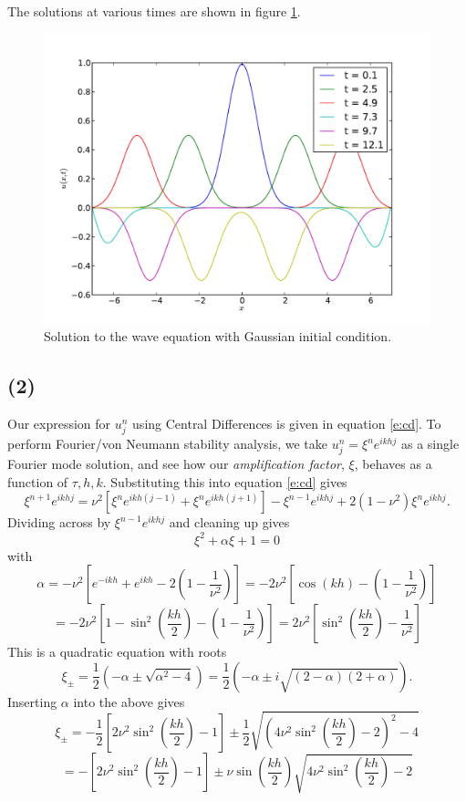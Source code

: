\documentclass[10pt]{article}
\newcommand{\ujn}{u_{j}^{n}}
\newcommand{\eihjk}{e^{ikhj}}
\newcommand{\eihjpk}{e^{ikh(j+1)}}
\newcommand{\eihjmk}{e^{ikh(j-1)}}
\begin{document}
The solutions at various times are shown in figure \ref{f:dirichlet}.
\begin{figure}
  \centering
  \includegraphics[width=\textwidth]{1/dirichlet.pdf}
  \caption{Solution to the wave equation with Gaussian initial condition.}
  \label{f:dirichlet}
\end{figure}

\subsection*{(2)}
Our expression for $\ujn$ using Central Differences is given in equation \ref{e:cd}.
To perform Fourier/von Neumann stability analysis, we take $\ujn = \xi^n \eihjk$ as
a single Fourier mode solution, and see how our {\it amplification factor}, $\xi$,
behaves as a function of $\tau,h,k$.
Substituting this into equation \ref{e:cd} gives
$$
\xi^{n+1} \eihjk= \nu^2 \left[ \xi^n \eihjmk + \xi^n \eihjpk \right] - \xi^{n-1} \eihjk +
2(1 - \nu^2) \xi^n \eihjk.
$$
Dividing across by $\xi^{n-1} \eihjk$ and cleaning up gives
$$
\xi^2 + \alpha \xi + 1 = 0
$$
with
$$\alpha = -\nu^2 \left[ e^{-ikh} + e^{ikh} - 2\left(1 - \frac{1}{\nu^2}\right) \right]
= -2 \nu^2 \left[ \cos(kh) - \left(1 - \frac{1}{\nu^2}\right) \right] $$
$$= -2 \nu^2 \left[ 1 - \sin^2\left(\frac{kh}{2}\right) - \left(1 - \frac{1}{\nu^2}\right) \right]
=  2 \nu^2 \left[ \sin^2\left(\frac{kh}{2}\right) - \frac{1}{\nu^2} \right] $$
This is a quadratic equation with roots
$$
\xi_\pm = \frac{1}{2} \left( -\alpha \pm \sqrt{\alpha^2 - 4} \right) =
\frac{1}{2} \left( -\alpha \pm i\sqrt{(2 - \alpha)(2+\alpha)}\right).
$$
Inserting $\alpha$ into the above gives
$$ \xi_\pm = -\frac{1}{2}\left[2\nu^2 \sin^2\left(\frac{kh}{2}\right) -1 \right]
\pm \frac{1}{2}\sqrt{\left(4\nu^2\sin^2\left(\frac{kh}{2}\right) -2\right)^2 - 4}
$$
$$ = -\left[2\nu^2 \sin^2\left(\frac{kh}{2}\right) -1 \right]
\pm \nu\sin\left(\frac{kh}{2}\right)\sqrt{4\nu^2\sin^2\left(\frac{kh}{2}\right) -2}
$$
\end{document}
